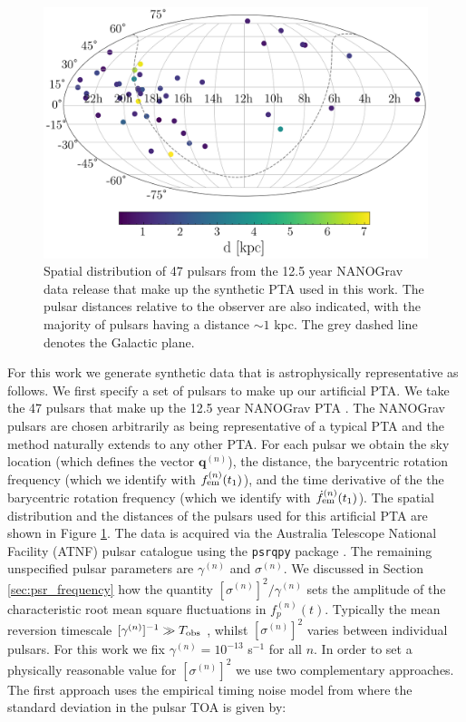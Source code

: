 \documentclass[fleqn,usenatbib,useAMS]{mnras}
\begin{document}
\begin{figure}
	\includegraphics[width=\columnwidth]{images/pulsar_distribution}
	\caption{Spatial distribution of 47 pulsars from the 12.5 year NANOGrav data release that make up the synthetic PTA used in this work. The pulsar distances relative to the observer are also indicated, with the majority of pulsars having a distance $\sim 1$ kpc. The grey dashed line denotes the Galactic plane.}
	\label{fig:pulsar_distrib}
\end{figure}
For this work we generate synthetic data that is astrophysically representative as follows. We first specify a set of pulsars to make up our artificial PTA. We take the 47 pulsars that make up the 12.5 year NANOGrav PTA \citep{2020ApJ...905L..34A}. The NANOGrav pulsars are chosen arbitrarily as being representative of a typical PTA and the method naturally extends to any other PTA. For each pulsar we obtain the sky location (which defines the vector $\boldsymbol{q}^{(n)}$), the distance, the barycentric rotation frequency (which we identify with $f_{\rm em}^{(n)} (t_1)$), and the time derivative of the the barycentric rotation frequency (which we identify with $\dot{f}_{\rm em}^{(n)} (t_1)$). The spatial distribution and the distances of the pulsars used for this artificial PTA are shown in Figure \ref{fig:pulsar_distrib}. The data is acquired via the Australia Telescope National Facility (ATNF) pulsar catalogue \citep{Manchester2005} using the \texttt{psrqpy} package \citep{psrqpy}. The remaining unspecified pulsar parameters are $\gamma^{(n)}$ and $\sigma^{(n)}$. We discussed in Section \ref{sec:psr_frequency} how the quantity $[\sigma^{(n)}]^2 /\gamma^{(n)} $ sets the amplitude of the characteristic root mean square fluctuations in $f_p^{(n)}(t)$. Typically the mean reversion timescale $[\gamma^{(n)}]^{-1} \gg T_{\rm obs}$ \citep{Vargas}, whilst $[\sigma^{(n)}]^2$ varies between individual pulsars. For this work we fix $\gamma^{(n)} = 10^{-13}$ s$^{-1}$ for all $n$. In order to set a physically reasonable value for $[\sigma^{(n)}]^2$ we use two complementary approaches. The first approach uses the empirical timing noise model from \cite{Shannon2010ApJ...725.1607S} where the standard deviation in the pulsar TOA is given by:
\end{document}
